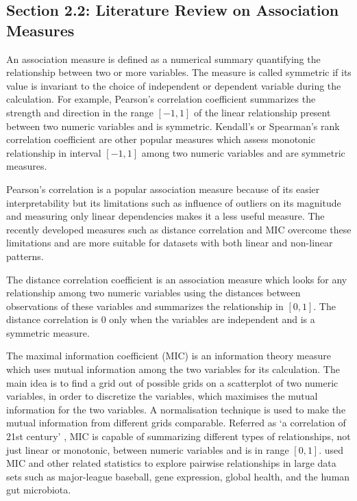 \hypertarget{section-2.2-literature-review-on-association-measures}{%
\subsection{Section 2.2: Literature Review on Association
Measures}\label{section-2.2-literature-review-on-association-measures}}

An association measure is defined as a numerical summary quantifying the
relationship between two or more variables. The measure is called
symmetric if its value is invariant to the choice of independent or
dependent variable during the calculation. For example, Pearson's
correlation coefficient summarizes the strength and direction in the
range \([-1,1]\) of the linear relationship present between two numeric
variables and is symmetric. Kendall's or Spearman's rank correlation
coefficient are other popular measures which assess monotonic
relationship in interval \([-1,1]\) among two numeric variables and are
symmetric measures.

Pearson's correlation is a popular association measure because of its
easier interpretability but its limitations such as influence of
outliers on its magnitude and measuring only linear dependencies makes
it a less useful measure. The recently developed measures such as
distance correlation \citep{szekely2007measuring} and MIC
\citep{reshef2011detecting} overcome these limitations and are more
suitable for datasets with both linear and non-linear patterns.

The distance correlation coefficient \citep{szekely2007measuring} is an
association measure which looks for any relationship among two numeric
variables using the distances between observations of these variables
and summarizes the relationship in \([0,1]\). The distance correlation
is \(0\) only when the variables are independent and is a symmetric
measure.

The maximal information coefficient (MIC) \citep{reshef2011detecting} is
an information theory measure which uses mutual information among the
two variables for its calculation. The main idea is to find a grid out
of possible grids on a scatterplot of two numeric variables, in order to
discretize the variables, which maximises the mutual information for the
two variables. A normalisation technique is used to make the mutual
information from different grids comparable. Referred as `a correlation
of 21st century' \citep{speed2011correlation}, MIC is capable of
summarizing different types of relationships, not just linear or
monotonic, between numeric variables and is in range \([0,1]\).
\citet{reshef2011detecting} used MIC and other related statistics to
explore pairwise relationships in large data sets such as major-league
baseball, gene expression, global health, and the human gut microbiota.

